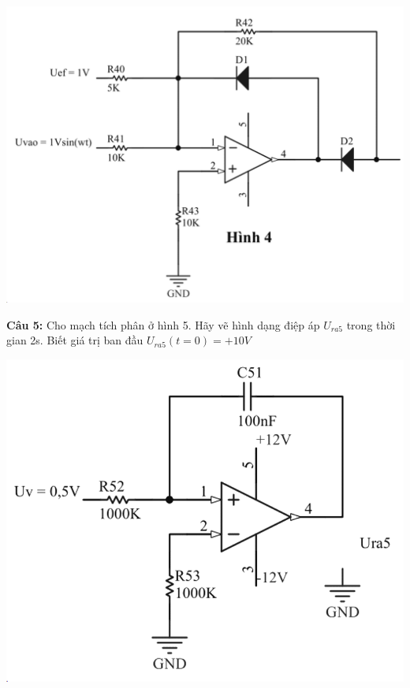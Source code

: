 \documentclass[10pt,a4paper]{article}
\begin{document}
		\begin{center}
			\includegraphics[width=0.9\linewidth]{screenshot004}
		\end{center}
		\vspace{1cm}
		\begin{flushleft}
			\color{red}\textbf{Câu 5: }\color{black} Cho mạch tích phân ở hình 5. Hãy vẽ hình dạng điệp áp $U_{ra5}$ trong thời gian 2s. Biết giá trị ban đầu $U_{ra5}(t = 0) = +10V$
		\end{flushleft}
		\begin{center}
			\includegraphics[width=0.9\linewidth]{screenshot005}
		\end{center}
		
		\newpage
	
	
\end{document}
